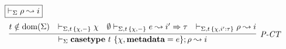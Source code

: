 

\begin{figure}[t]
$\fbox{$\vdash_\Sigma \rho \leadsto i$}$
%
\[
\begin{array}{c}
\infer[\textit{P-CT}]
          {%
	    \vdash_\Sigma \keyw{casetype}~ t~\{\chi, \keyw{metadata}=e\}; \rho \leadsto i
       }
	  {t \notin \text{dom}(\Sigma) & 
	  \vdash_{\Sigma, t\,\{\chi, -\}} \chi &
	  \emptyset \vdash_{\Sigma, t\,\{\chi,-\}} e \leadsto i' \Rightarrow \tau 
	   & \vdash_{ \Sigma, t\,\{\chi, i' : \tau\}} \rho \leadsto i}
	   \\[3ex] 
	   

\end{array}\]
\end{figure}
